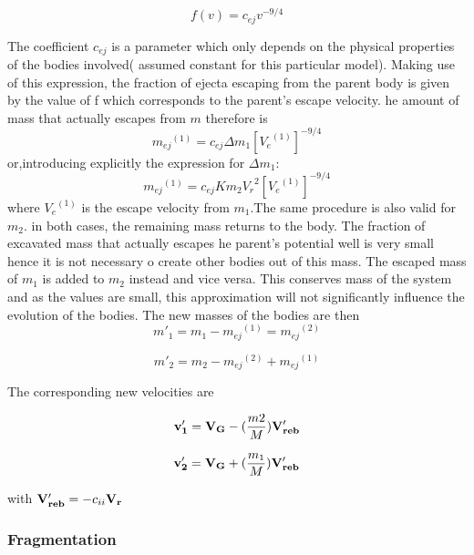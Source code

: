 \begin{equation}
f(v) = c_{ej}v^{-9/4}
\end{equation}

The coefficient $c_{ej}$ is a parameter which only depends on the physical properties of the bodies involved( assumed constant for this particular model). Making use of this expression, the fraction of ejecta escaping from the parent body is given by the value of f which corresponds to the parent's escape velocity. he amount of mass that actually escapes from  $m$ therefore is 
\begin{equation}
{m_{ej}}^{(1)} = c_{ej}\Delta m_{1} {[{V_{e}}^{(1)}]}^{-9/4}
\end{equation}
or,introducing explicitly the expression for $\Delta m_{1}$:
\begin{equation}
{m_{ej}}^{(1)} = c_{ej}Km_{2}{V_{r}}^{2}{[{V_{e}}^{(1)}]}^{-9/4}
\end{equation}
where ${V_{e}}^{(1)}$ is the escape velocity from $m_{1}$.The same procedure is also valid for $m_{2}$. in both cases, the remaining mass returns to the body.
The fraction of excavated mass that actually escapes he parent's potential well is very small hence it is not necessary o create other bodies out of this mass. The escaped mass of $m_{1}$ is added to $m_{2}$ instead and vice versa. This conserves mass of the system and as the values are small, this approximation will not significantly influence the evolution of the bodies. The new masses of the bodies are then 
\begin{equation}
m'_{1} = m_{1}-{m_{ej}}^{(1)}={m_{ej}}^{(2)}
\end{equation}

\begin{equation}
m'_{2} = m_{2}-{m_{ej}}^{(2)}+{m_{ej}}^{(1)}
\end{equation}

The corresponding new velocities are 

\begin{equation}
{\bf v'_{1}} = {\bf V_{G}} - (\frac{m2}{M}){\bf V'_{reb}} 
\end{equation}

\begin{equation}
{\bf v'_{2}} = {\bf V_{G}} + (\frac{m_{1}}{M}){\bf V'_{reb}}
\end{equation}

with ${\bf V'_{reb}} = -c_{ii}{\bf V_{r}}$

\subsubsection{Fragmentation}

